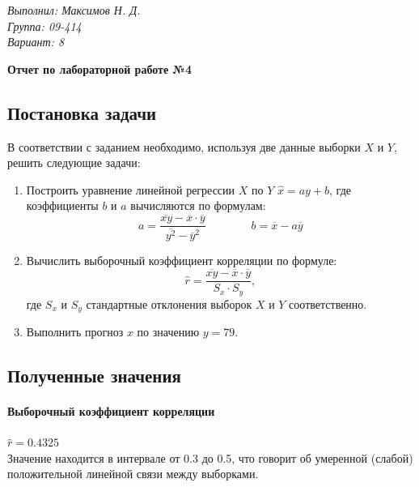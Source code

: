 \documentclass{article}
\begin{document}

\begin{flushright}
    \textit{Выполнил: Максимов Н. Д.} \\
    \textit{Группа: 09-414} \\
    \textit{Вариант: 8}
\end{flushright}

\begin{center}
    \bfseries\LARGE Отчет по лабораторной работе №4
\end{center}
\bigskip


\subsection*{Постановка задачи}

В соответствии с заданием необходимо, используя две данные выборки $X$ и $Y$, решить следующие задачи:

\begin{enumerate}
    \item Построить уравнение линейной регрессии $X$ по $Y$ $\hat x = ay + b$, где коэффициенты $b$ и $a$ вычисляются по формулам:
    \[ a = \frac{\overline{xy} - \overline x \cdot \overline y}{\overline{y^2} - \overline y ^ 2} \qquad\qquad b = \overline x - a \overline y \]
    \item Вычислить выборочный коэффициент корреляции по формуле:
    \[ \hat r = \frac{\overline{xy} - \overline x \cdot \overline y}{S_x \cdot S_y}, \]
    где $S_x$ и $S_y$ стандартные отклонения выборок $X$ и $Y$ соответственно.
    \item Выполнить прогноз $x$ по значению $y=79$.
\end{enumerate}


\subsection*{Полученные значения}

\paragraph{Выборочный коэффициент корреляции} $\hat r = 0.4325$ \\
Значение находится в интервале от 0.3 до 0.5, что говорит об умеренной (слабой) положительной линейной связи между выборками.
\end{document}
